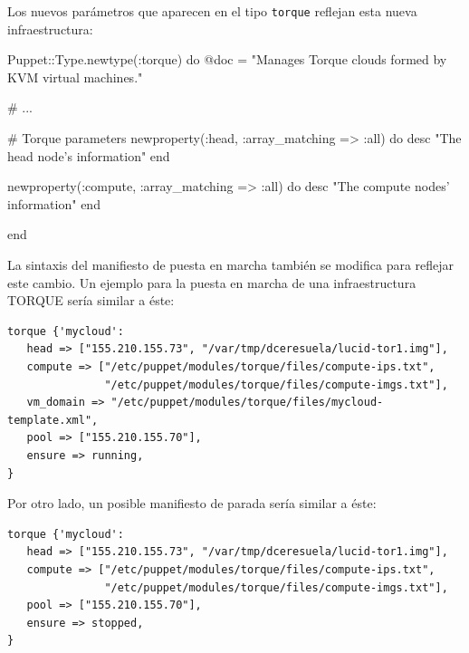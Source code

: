 Los nuevos parámetros que aparecen en el tipo \texttt{torque} reflejan esta nueva infraestructura:

\begin{rubycode}
Puppet::Type.newtype(:torque) do
   @doc = "Manages Torque clouds formed by KVM virtual machines."
   
   # ...

   # Torque parameters
   newproperty(:head, :array_matching => :all) do
      desc "The head node's information"
   end
   
   newproperty(:compute, :array_matching => :all) do
      desc "The compute nodes' information"
   end
   
end
\end{rubycode}

La sintaxis del manifiesto de puesta en marcha también se modifica para reflejar este cambio. Un ejemplo para la puesta en marcha de una infraestructura TORQUE sería similar a éste:

\begin{lstlisting}
torque {'mycloud':
   head => ["155.210.155.73", "/var/tmp/dceresuela/lucid-tor1.img"],
   compute => ["/etc/puppet/modules/torque/files/compute-ips.txt",
               "/etc/puppet/modules/torque/files/compute-imgs.txt"],
   vm_domain => "/etc/puppet/modules/torque/files/mycloud-template.xml",
   pool => ["155.210.155.70"],
   ensure => running,
}
\end{lstlisting}

Por otro lado, un posible manifiesto de parada sería similar a éste:

\begin{lstlisting}
torque {'mycloud':
   head => ["155.210.155.73", "/var/tmp/dceresuela/lucid-tor1.img"],
   compute => ["/etc/puppet/modules/torque/files/compute-ips.txt",
               "/etc/puppet/modules/torque/files/compute-imgs.txt"],
   pool => ["155.210.155.70"],
   ensure => stopped,
}
\end{lstlisting}


